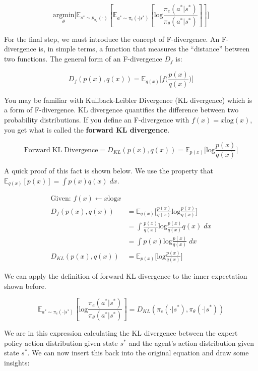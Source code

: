 \begin{flushleft}
    $$\underset{\theta}{\textrm{argmin}}\biggl[\mathbb{E}_{s^* \sim p_{\pi_e}(\cdot)}[\mathbb{E}_{a^* \sim \pi_e(\cdot|s^*)}[\mathrm{log}\frac{\pi_e(a^*|s^*)}{\pi_\theta(a^*|s^*)}]]\biggr]$$

    For the final step, we must introduce the concept of F-divergence. An F-divergence is, in simple terms, a function that measures the ``distance'' between two functions. The general form of an F-divergence $D_f$ is:

    $$D_f(p(x),q(x)) = \mathbb{E}_{q(x)} \biggl[ f\biggl( \frac{p(x)}{q(x)}\biggr)\biggr]$$
    
    You may be familiar with Kullback-Leibler Divergence (KL divergence) which is a form of F-divergence. KL divergence quantifies the difference between two probability distributions. If you define an F-divergence with $f(x) = x\mathrm{log}(x)$, you get what is called the \textbf{forward KL divergence}.
    
    $$\mathrm{Forward\;KL\;Divergence} = D_{KL}(p(x),q(x)) = \mathbb{E}_{p(x)} \biggl[\mathrm{log}\frac{p(x)}{q(x)}\biggr]$$
    
    A quick proof of this fact is shown below. We use the property that $\mathbb{E}_{q(x)}[p(x)] = \int p(x)q(x)\;dx$.

    \begin{align*}
        \textrm{Given: }f(x) \leftarrow x\mathrm{log}x \\
        D_f(p(x),q(x))\ &= \mathbb{E}_{q(x)} \biggl[ \frac{p(x)}{q(x)}\mathrm{log}\frac{p(x)}{q(x)}\biggr]\\
        &= \int \frac{p(x)}{q(x)}\mathrm{log}\frac{p(x)}{q(x)}q(x)\;dx\\
        &= \int p(x)\mathrm{log}\frac{p(x)}{q(x)}\;dx\\
        D_{KL}(p(x),q(x)) &= \mathbb{E}_{p(x)} \biggl[\mathrm{log}\frac{p(x)}{q(x)}\biggr]
    \end{align*}

    We can apply the definition of forward KL divergence to the inner expectation shown before.

    $$\mathbb{E}_{a^* \sim \pi_e(\cdot|s^*)}[\mathrm{log}\frac{\pi_e(a^*|s^*)}{\pi_\theta(a^*|s^*)}] = D_{KL}(\pi_e(\cdot|s^*),\pi_\theta(\cdot|s^*))$$

    We are in this expression calculating the KL divergence between the expert policy action distribution given state $s^*$ and the agent's action distribution given state $s^*$. We can now insert this back into the original equation and draw some insights:


\end{flushleft}
